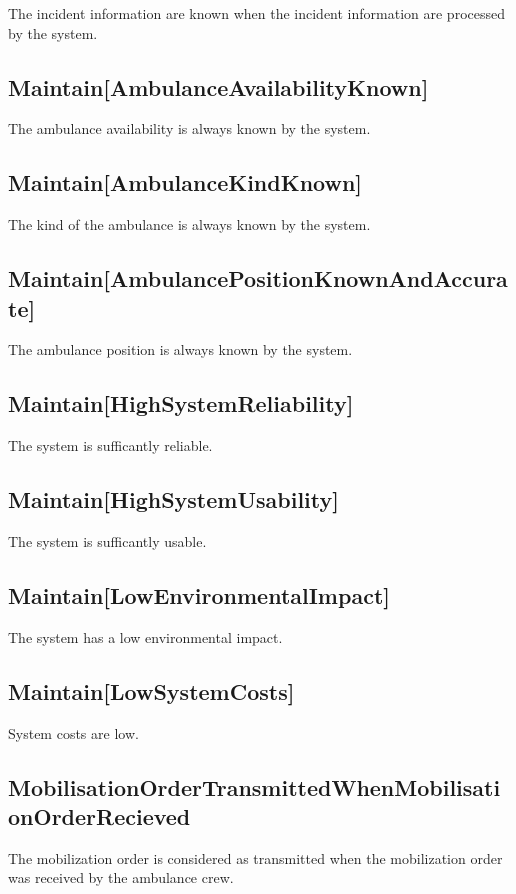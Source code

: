 The incident information are known when the incident information are processed by the system.


\subsection{Maintain[AmbulanceAvailabilityKnown]}

The ambulance availability is always known by the system.


\subsection{Maintain[AmbulanceKindKnown]}

The kind of the ambulance is always known by the system.


\subsection{Maintain[AmbulancePositionKnownAndAccurate]}

The ambulance position is always known by the system.


\subsection{Maintain[HighSystemReliability]}

The system is sufficantly reliable.
 

\subsection{Maintain[HighSystemUsability]}

The system is sufficantly usable.

 

\subsection{Maintain[LowEnvironmentalImpact]}
 
The system has a low environmental impact.


\subsection{Maintain[LowSystemCosts]}

System costs are low.
 

\subsection{MobilisationOrderTransmittedWhenMobilisationOrderRecieved}

The mobilization order is considered as transmitted when the mobilization order was received by the ambulance crew.
